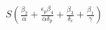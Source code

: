 \documentclass[preview]{standalone}
\begin{document}
\begin{center}
$S ( \frac{\beta_2}{\alpha} + \frac{\epsilon_p \beta_4}{\alpha \delta_p} + \frac{\beta_3}{\delta_c} + \frac{\beta_1}{\gamma} )$
\end{center}
\end{document}
